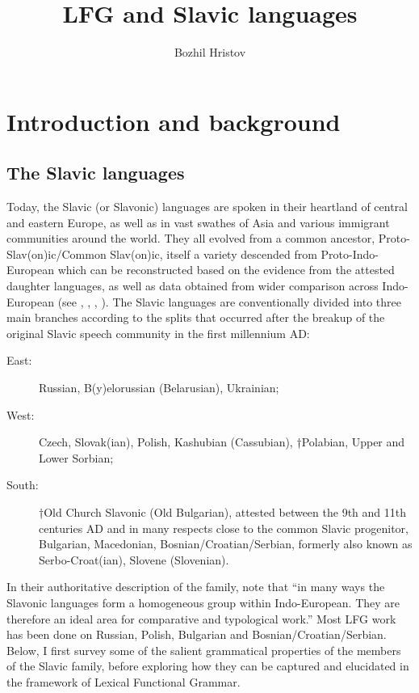 \documentclass[output=paper,hidelinks]{langscibook}
\title{LFG and Slavic languages}
\author{Bozhil Hristov\affiliation{University of Sofia}}
\begin{document}
\maketitle
\label{chap:Slavic}
\section{Introduction and background}
\label{sec:Slavic:1}

\subsection{The Slavic languages}
\label{sec:Slavic:1.1}

Today, the Slavic (or Slavonic) languages are spoken in their heartland of central and eastern Europe, as well as in vast swathes of Asia and various immigrant communities around the world. They all evolved from a common ancestor, Proto-Slav(on)ic/Common Slav(on)ic, itself a variety descended from Proto-Indo-European which can be reconstructed based on the evidence from the attested daughter languages, as well as data obtained from wider comparison across Indo-European (see \citealt{ComrieCorbett1993}, \citealt{Schenker1993,Schenker1995}, \citealt{SussexCubberley2006}, \citealt{BergerGutschmidtKempgenKosta2009}). The Slavic languages are conventionally divided into three main branches according to the splits that occurred after the breakup of the original Slavic speech community in the first millennium AD: 

\begin{description}
\item[East:] Russian, B(y)elorussian (Belarusian), Ukrainian; 
\item[West:] Czech, Slovak(ian), Polish, Kashubian (Cassubian), †Polabian, Upper and Lower Sorbian;
\item[South:] †Old Church Slavonic (Old Bulgarian), attested between the 9th and 11th centuries AD and in many respects close to the common Slavic progenitor, Bulgarian, Macedonian, Bosnian/Croatian/Serbian, formerly also known as Serbo-Croat(ian), Slovene (Slovenian).
\end{description}

In their authoritative description of the family, \citet[5]{ComrieCorbett1993} note that ``in many ways the Slavonic languages form a homogeneous group within Indo-European. They are therefore an ideal area for comparative and typological work.'' Most LFG work has been done on Russian, Polish, Bulgarian and Bosnian/Croatian/Serbian. Below, I first survey some of the salient grammatical properties of the members of the Slavic family, before exploring how they can be captured and elucidated in the framework of Lexical Functional Grammar.
\end{document}
